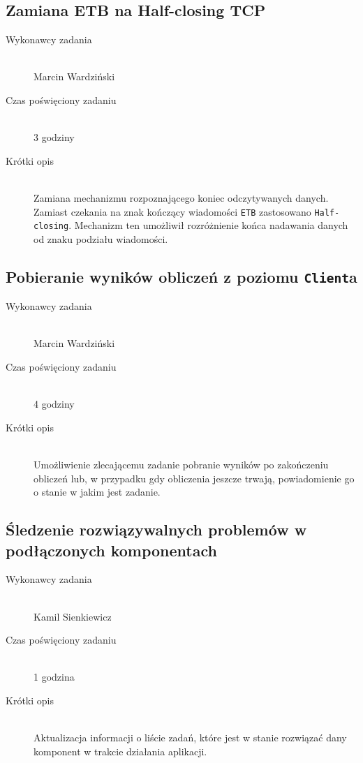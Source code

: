 \documentclass[a4paper]{article}
\begin{document}
\subsection{Zamiana ETB na Half-closing TCP}
\begin{description}
    \item[Wykonawcy zadania] \hfill \\ Marcin Wardziński
    \item[Czas poświęciony zadaniu] \hfill \\ 3 godziny
    \item[Krótki opis] \hfill \\ Zamiana mechanizmu rozpoznającego koniec odczytywanych danych. Zamiast czekania na znak kończący wiadomości \texttt{ETB} zastosowano \texttt{Half-closing}. Mechanizm ten umożliwił rozróżnienie końca nadawania danych od znaku podziału wiadomości.
\end{description} 

\subsection{Pobieranie wyników obliczeń z poziomu \texttt{Client}a}
\begin{description}
    \item[Wykonawcy zadania] \hfill \\ Marcin Wardziński
    \item[Czas poświęciony zadaniu] \hfill \\ 4 godziny
    \item[Krótki opis] \hfill \\ Umożliwienie zlecającemu zadanie pobranie wyników po zakończeniu obliczeń lub, w przypadku gdy obliczenia jeszcze trwają, powiadomienie go o stanie w jakim jest zadanie.
\end{description}

\subsection{Śledzenie rozwiązywalnych problemów w podłączonych komponentach}
\begin{description}
    \item[Wykonawcy zadania] \hfill \\ Kamil Sienkiewicz
    \item[Czas poświęciony zadaniu] \hfill \\ 1 godzina
    \item[Krótki opis] \hfill \\ Aktualizacja informacji o liście zadań, które jest w stanie rozwiązać dany komponent w trakcie działania aplikacji.
\end{description}
\end{document}
